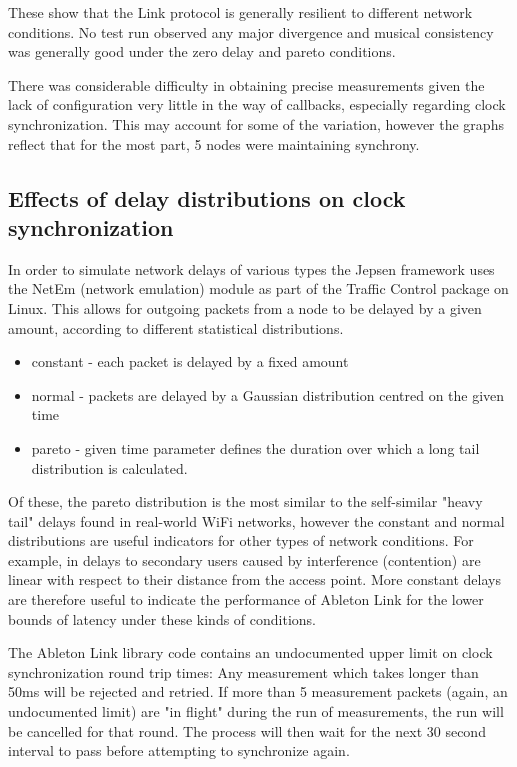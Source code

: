 \documentclass[11pt]{article} %
\theoremstyle{plain}
\theoremstyle{definition}
\begin{document}
These show that the Link protocol is generally resilient to different network
conditions. No test run observed any major divergence and musical consistency
was generally good under the zero delay and pareto conditions.

There was considerable difficulty in obtaining precise measurements given the
lack of configuration very little in the way of callbacks, especially regarding
clock synchronization. This may account for some of the variation, however the
graphs reflect that for the most part, 5 nodes were maintaining synchrony.

\subsection{Effects of delay distributions on clock synchronization}

In order to simulate network delays of various types the Jepsen framework uses
the NetEm (network emulation) module as part of the Traffic Control package on
Linux\cite{hemminger2005network}. This allows for outgoing packets from a node
to be delayed by a given amount, according to different statistical
distributions.

\begin{itemize}
  \item constant - each packet is delayed by a fixed amount
  \item normal - packets are delayed by a Gaussian distribution centred on the given time
  \item pareto - given time parameter defines the duration over which a long tail distribution is calculated.
\end{itemize}

Of these, the pareto distribution is the most similar to the self-similar
"heavy tail" delays found in real-world WiFi
networks\cite{bletsas2005evaluation}\cite{zhang2008delay}, however the constant
and normal distributions are useful indicators for other types of network
conditions. For example, in \cite{wang2014improving} delays to secondary users
caused by interference (contention) are linear with respect to their distance
from the access point.  More constant delays are therefore useful to indicate
the performance of Ableton Link for the lower bounds of latency under these
kinds of conditions.

The Ableton Link library code contains an undocumented upper limit on clock
synchronization round trip times: Any measurement which takes longer than 50ms
will be rejected and retried. If more than 5 measurement packets (again, an
undocumented limit) are "in flight" during the run of measurements, the run
will be cancelled for that round. The process will then wait for the next 30
second interval to pass before attempting to synchronize again.
\end{document}
